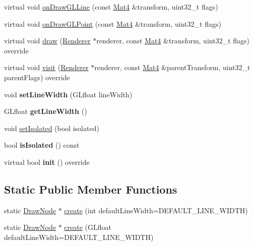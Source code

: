 \begin{DoxyCompactItemize}
virtual void \hyperlink{classDrawNode_a21bb183a4a833a64c3b37ee102cae6b5}{on\+Draw\+G\+L\+Line} (const \hyperlink{classMat4}{Mat4} \&transform, uint32\+\_\+t flags)
\item 
virtual void \hyperlink{classDrawNode_a57cdee495c8c817e6bc0dafd3228b998}{on\+Draw\+G\+L\+Point} (const \hyperlink{classMat4}{Mat4} \&transform, uint32\+\_\+t flags)
\item 
virtual void \hyperlink{classDrawNode_aa08f94d95bce895a248ae66251df846c}{draw} (\hyperlink{classRenderer}{Renderer} $\ast$renderer, const \hyperlink{classMat4}{Mat4} \&transform, uint32\+\_\+t flags) override
\item 
virtual void \hyperlink{classDrawNode_adffd70536383fa1dd73ab4a6e785808a}{visit} (\hyperlink{classRenderer}{Renderer} $\ast$renderer, const \hyperlink{classMat4}{Mat4} \&parent\+Transform, uint32\+\_\+t parent\+Flags) override
\item 
\mbox{\label{classDrawNode_ad0329ed528d2896ce7486c9917b9474d}} 
void {\bfseries set\+Line\+Width} (G\+Lfloat line\+Width)
\item 
\mbox{\label{classDrawNode_a017a52661990b0f71d7df51f87776204}} 
G\+Lfloat {\bfseries get\+Line\+Width} ()
\item 
void \hyperlink{classDrawNode_aea4968d4500887d631d759fccc8cf4df}{set\+Isolated} (bool isolated)
\item 
\mbox{\label{classDrawNode_ac7b1ab87bf6c497437570c0d7f553e77}} 
bool {\bfseries is\+Isolated} () const
\item 
\mbox{\label{classDrawNode_a1772f747a8ce3667ef5de7fe9baa315c}} 
virtual bool {\bfseries init} () override
\end{DoxyCompactItemize}
\subsection*{Static Public Member Functions}
\begin{DoxyCompactItemize}
\item 
static \hyperlink{classDrawNode}{Draw\+Node} $\ast$ \hyperlink{classDrawNode_af4af0612e76dd98c04d95a946e3fb47f}{create} (int default\+Line\+Width=D\+E\+F\+A\+U\+L\+T\+\_\+\+L\+I\+N\+E\+\_\+\+W\+I\+D\+TH)
\item 
static \hyperlink{classDrawNode}{Draw\+Node} $\ast$ \hyperlink{classDrawNode_a2caa3d228ff9195174ad1b8ea7a17cc0}{create} (G\+Lfloat default\+Line\+Width=D\+E\+F\+A\+U\+L\+T\+\_\+\+L\+I\+N\+E\+\_\+\+W\+I\+D\+TH)
\end{DoxyCompactItemize}
